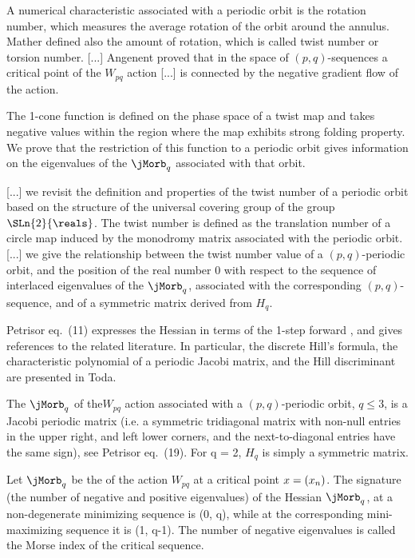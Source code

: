 \begin{description}
{A numerical
characteristic associated with a periodic orbit is the rotation number, which
measures the average rotation of the orbit around the annulus.
Mather defined also the amount of rotation, which is called twist
number or torsion number.
[...]
Angenent proved that in the space of $(p,q)$-sequences a critical
point of the $W_{pq}$ action [...]  is connected by the negative gradient flow of
the action.

The 1-cone function is defined on the phase space of a twist map and takes
negative values within the region where the map exhibits strong folding property.
We prove that the restriction of this function to a periodic orbit gives
information on the eigenvalues of the {\jacobianOrb} $\jMorb_q$ associated with that
orbit.

[...]
we revisit the definition and properties of the twist number of a periodic orbit
based on the structure of the universal covering group of the group
$\SLn{2}{\reals}$. The twist number is defined as the translation number of a circle
map induced by the monodromy matrix associated with the periodic orbit.
[...]
we give the relationship between the twist number value of a
$(p,q)$-periodic orbit, and the position of the real number 0 with
respect to the sequence of interlaced eigenvalues of the {\jacobianOrb}
$\jMorb_q$, associated with the corresponding $(p,q)$-sequence, and of a
symmetric matrix derived from $H_q$.

Petrisor eq.~(11) expresses the Hessian in terms of the 1-step forward
{\jacobianM}, and gives references to the related literature. In
particular, the discrete Hill's formula, the characteristic polynomial of
a periodic Jacobi matrix, and the Hill discriminant are presented in
Toda.

The {\jacobianOrb} $\jMorb_q$ of the$W_{pq}$ action associated with a
$(p,q)$-periodic orbit, $q \leq 3$, is a Jacobi periodic matrix (i.e. a
symmetric tridiagonal matrix with non-null entries in the upper right,
and left lower corners, and the next-to-diagonal entries have the same
sign), see Petrisor eq.~(19). For q = 2, $H_q$ is simply a symmetric
matrix.

Let $\jMorb_q$ be the {\jacobianOrb} of the action $W_{pq}$ at a critical
point $x = (x_n)$. The signature (the number of negative and
positive eigenvalues) of the Hessian $\jMorb_q$, at a non-degenerate
minimizing sequence is (0, q), while at the corresponding mini-maximizing
sequence it is (1, q-1). The number of negative eigenvalues is called the
Morse index of the critical sequence.
    }


\end{description}
